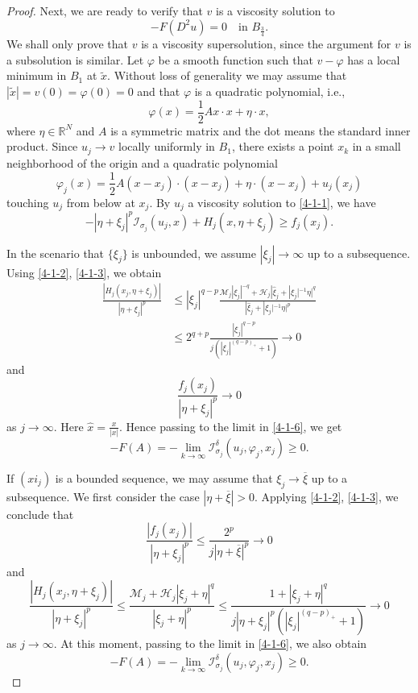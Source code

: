 \documentclass[11pt,reqno]{amsart}
\numberwithin{equation}{section}
\begin{document}
\begin{proof}
Next, we are ready to verify that $v$ is a viscosity solution to
\begin{equation}
\label{4-1-5}
-F(D^2u)=0   \quad \text{in }  B_{\frac34}.
\end{equation}
We shall only prove that $v$ is a viscosity supersolution, since the argument for $v$ is a subsolution is similar.
Let $\varphi$ be a smooth function such that $v-\varphi$ has a local minimum in $B_1$ at $\tilde{x}$.
Without loss of generality we may assume that $|\tilde{x}|=v(0)=\varphi(0)=0$ and that $\varphi$ is a quadratic polynomial, i.e.,
$$
\varphi(x)=\frac{1}{2}Ax\cdot x+\eta\cdot x,
$$
where $\eta\in\mathbb{R}^N$ and $A$ is a symmetric matrix and the dot means the standard inner product.
Since $u_j\rightarrow v$ locally uniformly in $B_1$, there exists a point $x_k$ in a small neighborhood of the origin and a quadratic polynomial
$$
\varphi_j(x)=\frac{1}{2}A(x-x_j)\cdot(x-x_j)+\eta\cdot(x-x_j)+u_j(x_j)
$$
touching $u_j$ from below at $x_j$. By $u_j$ a viscosity solution to \eqref{4-1-1}, we have
\begin{equation}
\label{4-1-6}
-|\eta+\xi_j|^p\mathcal{I}_{\sigma_j}(u_j,x)+H_j(x,\eta+\xi_j)\ge f_j(x_j).
\end{equation}

In the scenario that $\{\xi_j\}$ is unbounded, we assume $|\xi_j|\rightarrow\infty$ up to a subsequence. Using \eqref{4-1-2}, \eqref{4-1-3}, we obtain
\begin{align*}
\frac{|H_j(x_j,\eta+\xi_j)|}{|\eta+\xi_j|^p}
&\le |\xi_j|^{q-p}\frac{\mathcal{M}_j|\xi_j|^{-q}+\mathcal{H}_j|\hat{\xi}_j+|\xi_j|^{-1}\eta|^q}{|\hat{\xi}_j+|\xi_j|^{-1}\eta|^p}\\
&\le 2^{q+p}\frac{|\xi_j|^{q-p}}{j(|\xi_j|^{(q-p)_+}+1)}\rightarrow0
\end{align*}
and
$$
\frac{f_j(x_j)}{|\eta+\xi_j|^p}\rightarrow0
$$
as $j\rightarrow\infty$. Here $\hat{x}=\frac{x}{|x|}$. Hence passing to the limit in \eqref{4-1-6}, we get
$$
-F(A)=-\lim_{k\rightarrow\infty}\mathcal{I}^\delta_{\sigma_j}(u_j,\varphi_j,x_j)\ge 0.
$$

If $(xi_j)$ is a bounded sequence, we may assume that $\xi_j\rightarrow\overline{\xi}$ up to a subsequence.
We first consider the case $|\eta+\overline{\xi}|>0$. Applying \eqref{4-1-2}, \eqref{4-1-3},
we conclude that
\begin{equation*}
\frac{|f_j(x_j)|}{|\eta+\xi_j|^p}\le\frac{2^p}{j|\eta+\overline{\xi}|^p}\rightarrow0
\end{equation*}
and
$$
\frac{|H_j(x_j,\eta+\xi_j)|}{|\eta+\xi_j|^p}\le \frac{\mathcal{M}_j+\mathcal{H}_j|\xi_j+\eta|^q}{|\xi_j+\eta|^p}\le \frac{1+|\xi_j+\eta|^q}{j|\eta+\xi_j|^p(|\xi_j|^{(q-p)_+}+1)}\rightarrow0
$$
as $j\rightarrow\infty$. At this moment, passing to the limit in \eqref{4-1-6}, we also obtain
$$
-F(A)=-\lim_{k\rightarrow\infty}\mathcal{I}^\delta_{\sigma_j}(u_j,\varphi_j,x_j)\ge 0.
$$


\end{proof}
\end{document}
